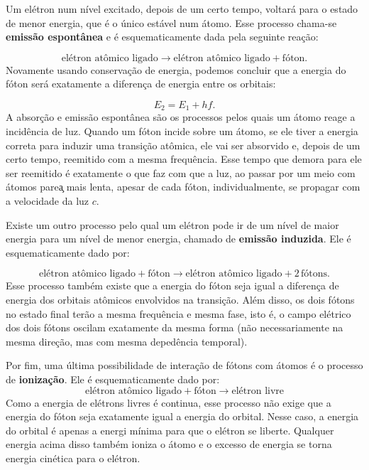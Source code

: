 \documentclass{article}
\begin{document}
Um el\'etron num n\'ivel excitado, depois de um certo tempo, voltar\'a para o estado de menor energia, que \'e o \'unico est\'avel num \'atomo. Esse processo chama-se \textbf{emiss\~ao espont\^anea} e \'e esquematicamente dada pela seguinte rea\c c\~ao:


\begin{equation}
\text{el\'etron at\^omico ligado} \rightarrow \text{el\'etron at\^omico ligado} + \text{f\'oton}.
\end{equation}
Novamente usando conserva\c c\~ao de energia, podemos concluir que a energia do f\'oton ser\'a exatamente a diferen\c ca de energia entre os orbitais:

\begin{equation}
E_2 = E_1 + hf.
\end{equation}
A absor\c c\~ao e emiss\~ao espont\^anea s\~ao os processos pelos quais um \'atomo reage a incid\^encia de luz. Quando um f\'oton incide sobre um \'atomo, se ele tiver a energia correta para induzir uma transi\c c\~ao at\^omica, ele vai ser absorvido e, depois de um certo tempo, reemitido com a mesma frequ\^encia. Esse tempo que demora para ele ser reemitido \'e exatamente o que faz com que a luz, ao passar por um meio com \'atomos pare\c a mais lenta, apesar de cada f\'oton, individualmente, se propagar com a velocidade da luz $c$.

Existe um outro processo pelo qual um el\'etron pode ir de um n\'ivel de maior energia para um n\'ivel de menor energia, chamado de \textbf{emiss\~ao induzida}. Ele \'e esquematicamente dado por:

\begin{equation}
\text{el\'etron at\^omico ligado} + \text{f\'oton} \rightarrow \text{el\'etron at\^omico ligado} + 2\,\text{f\'otons}.
\end{equation}
Esse processo tamb\'em existe que a energia do f\'oton seja igual a diferen\c ca de energia dos orbitais at\^omicos envolvidos na transi\c c\~ao. Al\'em disso, os dois f\'otons no estado final ter\~ao a mesma frequ\^encia e mesma fase, isto \'e, o campo el\'etrico dos dois f\'otons oscilam exatamente da mesma forma (n\~ao necessariamente na mesma dire\c c\~ao, mas com mesma deped\^encia temporal).

Por fim, uma \'ultima possibilidade de intera\c c\~ao de f\'otons com \'atomos \'e o processo de \textbf{ioniza\c c\~ao}. Ele \'e esquematicamente dado por:
\begin{equation}
\text{el\'etron at\^omico ligado} + \text{f\'oton} \rightarrow \text{el\'etron livre}
\end{equation}
Como a energia de el\'etrons livres \'e continua, esse processo n\~ao exige que a energia do f\'oton seja exatamente igual a energia do orbital. Nesse caso, a energia do orbital \'e apenas a energi m\'inima para que o el\'etron se liberte. Qualquer energia acima disso tamb\'em ioniza o \'atomo e o excesso de energia se torna energia cin\'etica para o el\'etron.
\end{document}
